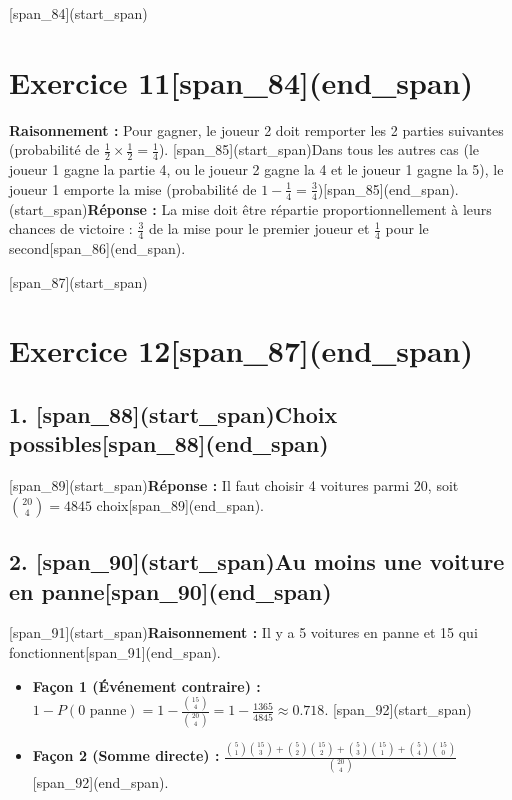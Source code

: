 \documentclass[11pt,a4paper]{article}
\begin{document}
\hrulefill

[span_84](start_span)\section*{Exercice 11[span_84](end_span)}
\textbf{Raisonnement :} Pour gagner, le joueur 2 doit remporter les 2 parties suivantes (probabilité de $\frac{1}{2} \times \frac{1}{2} = \frac{1}{4}$). [span_85](start_span)Dans tous les autres cas (le joueur 1 gagne la partie 4, ou le joueur 2 gagne la 4 et le joueur 1 gagne la 5), le joueur 1 emporte la mise (probabilité de $1 - \frac{1}{4} = \frac{3}{4}$)[span_85](end_span).\\
[span_86](start_span)\textbf{Réponse :} La mise doit être répartie proportionnellement à leurs chances de victoire : $\frac{3}{4}$ de la mise pour le premier joueur et $\frac{1}{4}$ pour le second[span_86](end_span).

\hrulefill

[span_87](start_span)\section*{Exercice 12[span_87](end_span)}
\subsection*{1. [span_88](start_span)Choix possibles[span_88](end_span)}
[span_89](start_span)\textbf{Réponse :} Il faut choisir 4 voitures parmi 20, soit $\binom{20}{4} = 4845$ choix[span_89](end_span).

\subsection*{2. [span_90](start_span)Au moins une voiture en panne[span_90](end_span)}
[span_91](start_span)\textbf{Raisonnement :} Il y a 5 voitures en panne et 15 qui fonctionnent[span_91](end_span).
\begin{itemize}
    \item \textbf{Façon 1 (Événement contraire) :} $1 - P(\text{0 panne}) = 1 - \frac{\binom{15}{4}}{\binom{20}{4}} = 1 - \frac{1365}{4845} \approx 0.718$.
    [span_92](start_span)\item \textbf{Façon 2 (Somme directe) :} $\frac{\binom{5}{1}\binom{15}{3} + \binom{5}{2}\binom{15}{2} + \binom{5}{3}\binom{15}{1} + \binom{5}{4}\binom{15}{0}}{\binom{20}{4}}$[span_92](end_span).
\end{itemize}
\end{document}
